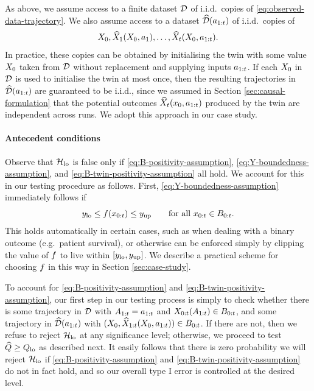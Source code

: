 As above, we assume access to a finite dataset $\mathcal{D}$ of i.i.d.\ copies of \eqref{eq:observed-data-trajectory}.
We also assume access to a dataset $\widehat{\mathcal{D}}(a_{1:t})$ of i.i.d.\ copies of
\begin{equation} \label{eq:twin-trajecs}
    X_0, \widehat{X}_1(X_0, a_1), \ldots, \widehat{X}_t(X_0, a_{1:t}).
\end{equation}
In practice, these copies can be obtained by initialising the twin with some value $X_0$ taken from $\mathcal{D}$ without replacement and supplying inputs $a_{1:t}$.
If each $X_0$ in $\mathcal{D}$ is used to initialise the twin at most once, then the resulting trajectories in $\widehat{\mathcal{D}}(a_{1:t})$ are guaranteed to be i.i.d., since we assumed in Section \ref{sec:causal-formulation} that the potential outcomes $\widehat{X}_t(x_0, a_{1:t})$ produced by the twin are independent across runs.
We adopt this approach in our case study.

%

%
%

\paragraph{Antecedent conditions}

Observe that $\mathcal{H}_{\mathrm{lo}}$ is false only if \eqref{eq:B-positivity-assumption}, \eqref{eq:Y-boundedness-assumption}, and \eqref{eq:B-twin-positivity-assumption} all hold.
We account for this in our testing procedure as follows.
First, \eqref{eq:Y-boundedness-assumption} immediately follows if 
%
\begin{equation} \label{eq:fx-boundedness-assumption}
    y_{\mathrm{lo}} \leq f(x_{0:t}) \leq y_{\mathrm{up}} \qquad \text{for all $x_{0:t} \in B_{0:t}$.}
\end{equation}
This holds automatically in certain cases, such as when dealing with a binary outcome (e.g.\ patient survival), or otherwise can be enforced simply by clipping the value of $f$ to live within $[y_{\mathrm{lo}}, y_{\mathrm{up}}]$.
We describe a practical scheme for choosing $f$ in this way in Section \ref{sec:case-study}.

To account for \eqref{eq:B-positivity-assumption} and \eqref{eq:B-twin-positivity-assumption}, our first step in our testing process is simply to check whether there is some trajectory in $\mathcal{D}$ with $A_{1:t} = a_{1:t}$ and $X_{0:t}(A_{1:t}) \in B_{0:t}$, and some trajectory in $\widehat{\mathcal{D}}(a_{1:t})$ with $(X_0, \widehat{X}_{1:t}(X_0, a_{1:t})) \in B_{0:t}$.
If there are not, then we refuse to reject $\mathcal{H}_{\mathrm{lo}}$ at any significance level; otherwise, we proceed to test $\widehat{Q} \geq Q_{\mathrm{lo}}$ as described next.
%
%
%
It easily follows that there is zero probability we will reject $\mathcal{H}_{\mathrm{lo}}$ if \eqref{eq:B-positivity-assumption} and \eqref{eq:B-twin-positivity-assumption} do not in fact hold, and so our overall type I error is controlled at the desired level.

